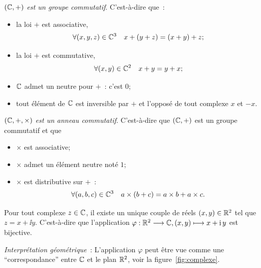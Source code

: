 \begin{prop}
    \emph{\((\mathbb{C}, + )\) est un groupe commutatif}. C'est-à-dire que~:
    \begin{itemize}
        \item la loi \( + \) est associative,
            \begin{equation}
                \forall (x, y, z) \in \mathbb{C}^3 \quad x + (y + z) = (x + y) + z;
            \end{equation}
        \item la loi \( + \) est commutative,
            \begin{equation}
                \forall (x,y) \in \mathbb{C}^2 \quad x + y = y + x;
            \end{equation}
        \item \(\mathbb{C}\) admet un neutre pour \(+\)~: c'est \(0\);
        \item tout élément de \(\mathbb{C}\) est inversible par \(+\) et l'opposé de           
            tout complexe \(x\) et \(-x\).
    \end{itemize}
\end{prop}

\begin{prop}
    \emph{\((\mathbb{C}, + ,\times)\) est un anneau commutatif}. C'est-à-dire que 
    \((\mathbb{C}, + )\) est un groupe commutatif et que
    \begin{itemize}
        \item \(\times\) est associative;
        \item \(\times\) admet un élément neutre noté \(1\);
        \item \(\times\) est distributive sur \( + \)~:
            \begin{equation}
                \forall (a, b, c) \in \mathbb{C}^3 \quad a \times (b + c) = a \times b+ a 
                \times c.
            \end{equation}
    \end{itemize}
\end{prop}

\begin{prop}
    Pour tout complexe \(z \in \mathbb{C}\), il existe un unique couple de réels \((x, y) 
    \in \mathbb{R}^2\) tel que \(z = x + \ii y\). C'est-à-dire que l'application 
    \(\varphi:\mathbb{R}^2 \longrightarrow \mathbb{C}, (x, y) \longmapsto x + \operatorname{i} y\) est bijective.
\end{prop}

\emph{Interprétation géométrique}~: L'application $\varphi$ peut être vue comme 
une ``correspondance'' entre $\mathbb{C}$ et le plan $\mathbb{R}^2$, voir la 
figure~\ref{fig:complexe}.

